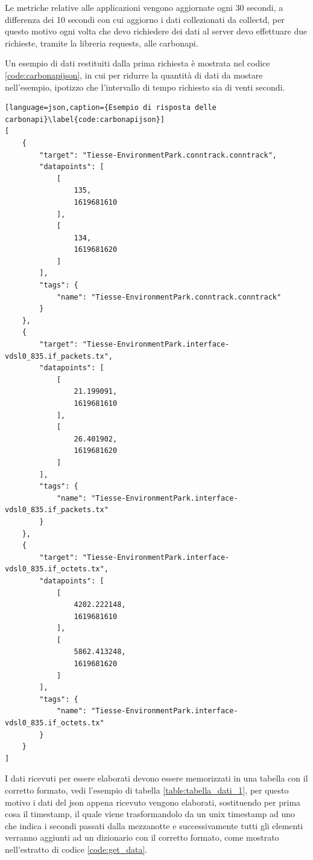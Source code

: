 Le metriche relative alle applicazioni vengono aggiornate ogni 30 secondi, a differenza dei 10 secondi con cui aggiorno i dati collezionati da collectd, per questo motivo ogni volta che devo richiedere dei dati al server devo effettuare due richieste, tramite la libreria requests, alle carbonapi.


Un esempio di dati restituiti dalla prima richiesta è mostrata nel codice \ref{code:carbonapijson}, in cui per ridurre la quantità di dati da mostare nell'esempio, ipotizzo che l'intervallo di tempo richiesto sia di venti secondi.

\begin{lstlisting}[language=json,caption={Esempio di risposta delle carbonapi}\label{code:carbonapijson}]
[
    {
        "target": "Tiesse-EnvironmentPark.conntrack.conntrack",
        "datapoints": [
            [
                135,
                1619681610
            ],
            [
                134,
                1619681620
            ]
        ],
        "tags": {
            "name": "Tiesse-EnvironmentPark.conntrack.conntrack"
        }
    },
    {
        "target": "Tiesse-EnvironmentPark.interface-vdsl0_835.if_packets.tx",
        "datapoints": [
            [
                21.199091,
                1619681610
            ],
            [
                26.401902,
                1619681620
            ]
        ],
        "tags": {
            "name": "Tiesse-EnvironmentPark.interface-vdsl0_835.if_packets.tx"
        }
    },
    {
        "target": "Tiesse-EnvironmentPark.interface-vdsl0_835.if_octets.tx",
        "datapoints": [
            [
                4202.222148,
                1619681610
            ],
            [
                5862.413248,
                1619681620
            ]
        ],
        "tags": {
            "name": "Tiesse-EnvironmentPark.interface-vdsl0_835.if_octets.tx"
        }
    }
]
\end{lstlisting}
I dati ricevuti per essere elaborati devono essere memorizzati in una tabella con il corretto formato, vedi l'esempio di tabella \ref{table:tabella_dati_1}, per questo motivo i dati del json appena ricevuto vengono elaborati, sostituendo per prima cosa il timestamp, il quale viene trasformandolo da un unix timestamp ad uno che indica i secondi passati dalla mezzanotte e successivamente tutti gli elementi verranno aggiunti ad un dizionario con il corretto formato, come mostrato nell'estratto di codice \ref{code:get_data}.

